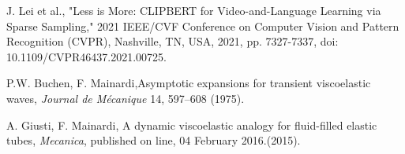 \begin{thebibliography}{}
    
J. Lei et al., "Less is More: CLIPBERT for Video-and-Language Learning via Sparse Sampling," 2021 IEEE/CVF Conference on Computer Vision and Pattern Recognition (CVPR), Nashville, TN, USA, 2021, pp. 7327-7337, doi: 10.1109/CVPR46437.2021.00725.

P.W. Buchen, F. Mainardi,Asymptotic expansions for transient viscoelastic waves, {\it Journal de M{\'e}canique} {14},  597--608 (1975).

A. Giusti, F. Mainardi, A dynamic viscoelastic analogy for fluid-filled elastic tubes, {\it Mecanica}, published on line, 04 February  2016.(2015).
\end{thebibliography}
